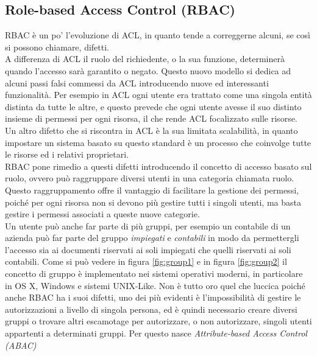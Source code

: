 \subsection*{Role-based Access Control (RBAC)} %
\label{sub:role_based_access_control}

RBAC è un po' l'evoluzione di ACL, in quanto tende a correggerne alcuni, se così si possono chiamare, difetti.\\
A differenza di ACL il ruolo del richiedente, o la sua funzione, determinerà quando l'accesso sarà garantito o negato.
Questo nuovo modello si dedica ad alcuni passi falsi commessi da ACL introducendo nuove ed interessanti funzionalità. Per esempio in ACL ogni utente era trattato come una singola entità distinta da tutte le altre, e questo prevede che ogni utente avesse il suo distinto insieme di permessi per ogni risorsa, il che rende ACL focalizzato sulle risorse.\\
Un altro difetto che si riscontra in ACL è la sua limitata scalabilità, in quanto 
impostare un sistema basato su questo standard è un processo che coinvolge tutte le risorse ed i relativi proprietari.\\
RBAC pone rimedio a questi difetti introducendo il concetto di accesso basato sul ruolo, ovvero può raggruppare diversi utenti in una categoria chiamata ruolo. 
Questo raggruppamento offre il vantaggio di facilitare la gestione dei permessi, poiché per ogni risorsa non si devono più gestire tutti i singoli utenti, ma basta gestire i permessi associati a queste nuove categorie.\\
Un utente può anche far parte di più gruppi, per esempio un contabile di un azienda può far parte del gruppo \textit{impiegati} e \textit{contabili} in modo da permettergli l'accesso sia ai documenti riservati ai soli impiegati che quelli riservati ai soli contabili.
Come si può vedere in figura \ref{fig:group1} e in figura \ref{fig:group2} il concetto di gruppo è implementato nei sistemi operativi moderni, in particolare in OS X, Windows e sistemi UNIX-Like.
Non è tutto oro quel che luccica poiché anche RBAC ha i suoi difetti, uno dei più evidenti è l'impossibilità di gestire le autorizzazioni a livello di singola persona, ed è quindi necessario creare diversi gruppi o trovare altri escamotage per autorizzare, o non autorizzare, singoli utenti appartenti a determinati gruppi. Per questo nasce \textit{Attribute-based Access Control (ABAC)}


